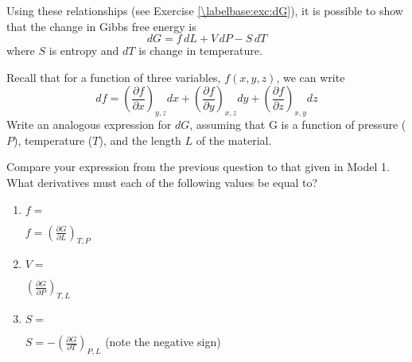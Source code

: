 \begin{activity}
\begin{model}
	Using these relationships (see Exercise \ref{\labelbase:exc:dG}), it is possible to show that the change in Gibbs free energy is
	\begin{equation*}
		dG = f\,dL + V\,dP - S\,dT
	\end{equation*}
	where $S$ is entropy and $dT$ is change in temperature.

\end{model}


\begin{ctqs}

	\question Recall that for a function of three variables, $f(x,y,z)$, we can write
		\begin{equation*}
			df = \left(\frac{\partial f}{\partial x}\right)_{y,z}dx + 
				\left(\frac{\partial f}{\partial y}\right)_{x,z}dy +
				\left(\frac{\partial f}{\partial z}\right)_{x,y}dz
		\end{equation*}
		Write an analogous expression for $dG$, assuming that G is a function of pressure ($P$), temperature ($T$), and the length $L$ of the material.
		
		\begin{solution}[1in]\end{solution}
		
	\question Compare your expression from the previous question to that given in Model 1.  What derivatives must each of the following values be equal to?
	
		\begin{enumerate}
			\item $f=$ \label{\labelbase:ctq:fderiv}
				\begin{solution}[0.5in]
					$f = \left(\frac{\partial G}{\partial L}\right)_{T,P}$
				\end{solution}
			\item $V=$
				\begin{solution}[0.5in]
					$\left(\frac{\partial G}{\partial P}\right)_{T,L}$
				\end{solution}
			\item $S=$
				\begin{solution}[0.5in]
					$S=  -\left(\frac{\partial G}{\partial T}\right)_{P,L}$ (note the negative sign)
				\end{solution}
		\end{enumerate}
		

\end{ctqs}
\end{activity}

